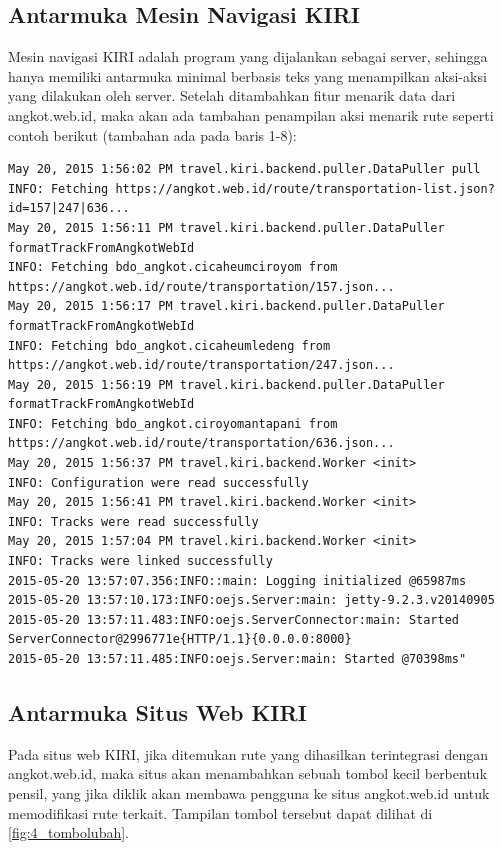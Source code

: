 \subsection{Antarmuka Mesin Navigasi KIRI}

Mesin navigasi KIRI adalah program yang dijalankan sebagai server, sehingga hanya memiliki antarmuka minimal berbasis teks yang menampilkan aksi-aksi yang dilakukan oleh server. Setelah ditambahkan fitur menarik data dari angkot.web.id, maka akan ada tambahan penampilan aksi menarik rute seperti contoh berikut (tambahan ada pada baris 1-8):

\begin{lstlisting}
May 20, 2015 1:56:02 PM travel.kiri.backend.puller.DataPuller pull
INFO: Fetching https://angkot.web.id/route/transportation-list.json?id=157|247|636...
May 20, 2015 1:56:11 PM travel.kiri.backend.puller.DataPuller formatTrackFromAngkotWebId
INFO: Fetching bdo_angkot.cicaheumciroyom from https://angkot.web.id/route/transportation/157.json...
May 20, 2015 1:56:17 PM travel.kiri.backend.puller.DataPuller formatTrackFromAngkotWebId
INFO: Fetching bdo_angkot.cicaheumledeng from https://angkot.web.id/route/transportation/247.json...
May 20, 2015 1:56:19 PM travel.kiri.backend.puller.DataPuller formatTrackFromAngkotWebId
INFO: Fetching bdo_angkot.ciroyomantapani from https://angkot.web.id/route/transportation/636.json...
May 20, 2015 1:56:37 PM travel.kiri.backend.Worker <init>
INFO: Configuration were read successfully
May 20, 2015 1:56:41 PM travel.kiri.backend.Worker <init>
INFO: Tracks were read successfully
May 20, 2015 1:57:04 PM travel.kiri.backend.Worker <init>
INFO: Tracks were linked successfully
2015-05-20 13:57:07.356:INFO::main: Logging initialized @65987ms
2015-05-20 13:57:10.173:INFO:oejs.Server:main: jetty-9.2.3.v20140905
2015-05-20 13:57:11.483:INFO:oejs.ServerConnector:main: Started ServerConnector@2996771e{HTTP/1.1}{0.0.0.0:8000}
2015-05-20 13:57:11.485:INFO:oejs.Server:main: Started @70398ms"
\end{lstlisting}


\subsection{Antarmuka Situs Web KIRI}

Pada situs web KIRI, jika ditemukan rute yang dihasilkan terintegrasi dengan angkot.web.id, maka situs akan menambahkan sebuah tombol kecil berbentuk pensil, yang jika diklik akan membawa pengguna ke situs angkot.web.id untuk memodifikasi rute terkait. Tampilan tombol tersebut dapat dilihat di \ref{fig:4_tombolubah}.

